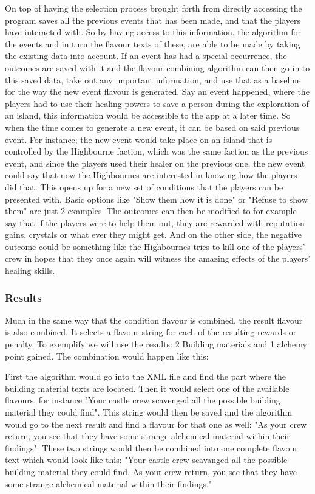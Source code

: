 On top of having the selection process brought forth from directly accessing the program saves all the previous events that has been made, and that the players have interacted with. So by having access to this information, the algorithm for the events and in turn the flavour texts of these, are able to be made by taking the existing data into account. If an event has had a special occurrence, the outcomes are saved with it and the flavour combining algorithm can then go in to this saved data, take out any important information, and use that as a baseline for the way the new event flavour is generated. Say an event happened, where the players had to use their healing powers to save a person during the exploration of an island, this information would be accessible to the app at a later time. So when the time comes to generate a new event, it can be based on said previous event. For instance; the new event would take place on an island that is controlled by the Highbourne faction, which was the same faction as the previous event, and since the players used their healer on the previous one, the new event could say that now the Highbournes are interested in knowing how the players did that. This opens up for a new set of conditions that the players can be presented with. Basic options like "Show them how it is done" or "Refuse to show them" are just 2 examples. The outcomes can then be modified to for example say that if the players were to help them out, they are rewarded with reputation gains, crystals or what ever they might get. And on the other side, the negative outcome could be something like the Highbournes tries to kill one of the players' crew in hopes that they once again will witness the amazing effects of the players' healing skills.
\subsubsection{Results}
Much in the same way that the condition flavour is combined, the result flavour is also combined. It selects a flavour string for each of the resulting rewards or penalty. To exemplify we will use the results: 2 Building materials and 1 alchemy point gained.
The combination would happen like this:

First the algorithm would go into the XML file and find the part where the building material texts are located. Then it would select one of the available flavours, for instance "Your castle crew scavenged all the possible building material they could find". This string would then be saved and the algorithm would go to the next result and find a flavour for that one as well: "As your crew return, you see that they have some strange alchemical material within their findings". 
These two strings would then be combined into one complete flavour text which would look like this: "Your castle crew scavanged all the possible building material they could find. As your crew return, you see that they have some strange alchemical material within their findings."

